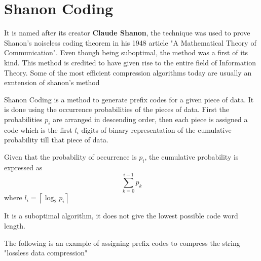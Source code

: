 \documentclass{article}
\begin{document}
\section {Shanon Coding}

It is named after its creator \textbf{Claude Shanon}, the technique was used to prove Shanon's noiseless coding theorem in his 1948 article "A Mathematical Theory of Communication"\cite{shannon1948mathematical}. Even though being suboptimal, the method was a first of its kind. This method is credited to have given rise to the entire field of Information Theory. Some of the most efficient compression algorithms today are usually an exntension of shanon's method

Shanon Coding is a method to generate prefix codes for a given piece of data. It is done using the occurrence probabilities of the pieces of data. First the probabilities $p_{i}$ are arranged in descending order, then each piece is assigned a code which is the first $l_{i}$ digits of binary representation of the cumulative probability till that piece of data. 


Given that the probability of occurrence is $p_{i}$, the cumulative probability is expressed as 
$$\sum_{k=0}^{i-1} p_{k}$$ where $l_{i} = \left \lceil \log_{2} p_{i} \right \rceil$ 

It is a suboptimal algorithm, it does not give the lowest possible code word length.

The following is an example of assigning prefix codes to compress the string "lossless data compression"
\end{document}
